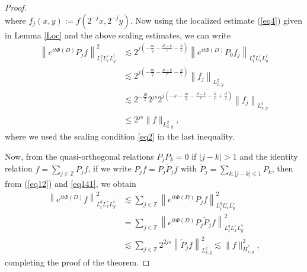 \documentclass[a4paper,11pt, reqno]{amsart}
\theoremstyle{definition}
\theoremstyle{remark}
\newtheorem{rem}[theorem]{Remark}
\numberwithin{equation}{section}
\begin{document}
\begin{proof}
$$		$$
  where $f_j(x, y):=f\left(2^{-j} x, 2^{-j} y\right)$.  Now using the localized estimate (\ref{eq4}) given in Lemma \ref{Loc} and the above scaling estimates,  we can write 
		\begin{align}\label{eq141}\nonumber
			\left\|e^{i t\Phi(D)} P_j f\right\|_{L_t^q L_x^r L_y^{\tilde{r}}}^2 
			&   \lesssim 2^{j\left(-\frac{{m}}{q}-\frac{d-k}{r}-\frac{k}{\tilde{r}}\right)}\left\|e^{i t\Phi(D)} P_0 f_j\right\|_{L_t^q L_x^r L_y^{\tilde{r}}} \\\nonumber
			& \lesssim 2^{j\left(-\frac{{{m}}}{q}-\frac{d-k}{r}-\frac{k}{\tilde{r}}\right)}\left\|f_j\right\|_{L_{x, y}^2} \\\nonumber
			& \lesssim  2^{-\frac{jd}{2}}2^{js}2^{j\left(-s-\frac{{{m}}}{q}-\frac{d-k}{r}-\frac{k}{\tilde{r}}+\frac{d}{2}\right)}\left\|f_j\right\|_{L_{x, y}^2} \\
			& \leq  2^{j s}\|f\|_{L_{x, y}^2},
		\end{align}
		where we used the scaling condition \eqref{eq2} in the last inequality.  
        
        Now, from  the quasi-orthogonal relations $P_jP_k=0$ if $|j-k|>1$ and the identity relation $f= \displaystyle \sum_{j \in \mathbb{Z}} P_j f$,   if we write $P_j f=P_j \widetilde{P}_j f$   with $\widetilde{P}_j=\sum_{k:|j-k| \leq 1} P_k$, then   from    (\ref{eq12}) and \eqref{eq141}, we obtain  
		$$
		\begin{aligned}
			\left\|e^{i t\Phi(D)} f\right\|_{L_t^q L_x^r L_y^{\tilde{r}}}^2  
			& \lesssim \sum_{j \in \mathbb{Z}}\left\|e^{i t\Phi(D)} P_j f\right\|_{L_t^q L_x^r L_y^{\tilde{r}}}^2 \\
			&= \sum_{j \in \mathbb{Z}}\left\|e^{i t\Phi(D)} P_j \widetilde{P}_j f\right\|_{L_t^q L_x^r L_y^{\tilde{\tau}}}^2\\
			&   \lesssim \sum_{j \in \mathbb{Z}} 2^{2 j s}\left\|\widetilde{P}_j f\right\|_{L_{x, y}^2}^2 \lesssim\|f\|_{\dot{H}_{x, y}^s}^2,
		\end{aligned}
		$$
		completing the proof of the theorem. 
		\end{proof}
	
	
	
	
	
	
	
	
    
\end{document}
